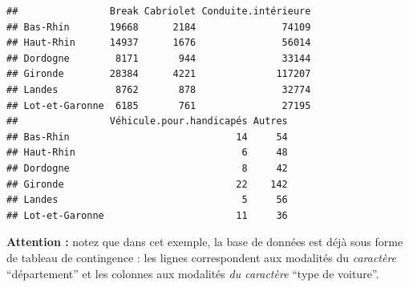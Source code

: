 \documentclass[]{book}
\newenvironment{Shaded}{\begin{snugshade}}{\end{snugshade}}
\newcommand{\DataTypeTok}[1]{\textcolor[rgb]{0.13,0.29,0.53}{#1}}
\newcommand{\DecValTok}[1]{\textcolor[rgb]{0.00,0.00,0.81}{#1}}
\newcommand{\KeywordTok}[1]{\textcolor[rgb]{0.13,0.29,0.53}{\textbf{#1}}}
\newcommand{\NormalTok}[1]{#1}
\newcommand{\OperatorTok}[1]{\textcolor[rgb]{0.81,0.36,0.00}{\textbf{#1}}}
\newcommand{\StringTok}[1]{\textcolor[rgb]{0.31,0.60,0.02}{#1}}
\begin{document}
\begin{Shaded}
\end{Shaded}

\begin{verbatim}
##                Break Cabriolet Conduite.intérieure
## Bas-Rhin       19668      2184               74109
## Haut-Rhin      14937      1676               56014
## Dordogne        8171       944               33144
## Gironde        28384      4221              117207
## Landes          8762       878               32774
## Lot-et-Garonne  6185       761               27195
##                Véhicule.pour.handicapés Autres
## Bas-Rhin                             14     54
## Haut-Rhin                             6     48
## Dordogne                              8     42
## Gironde                              22    142
## Landes                                5     56
## Lot-et-Garonne                       11     36
\end{verbatim}

\textbf{Attention : }notez que dans cet exemple, la base de données est déjà sous forme de tableau de contingence : les lignes correspondent aux modalités du \emph{caractère} ``département'' et les colonnes aux modalités \emph{du caractère} ``type de voiture''.
\end{document}
